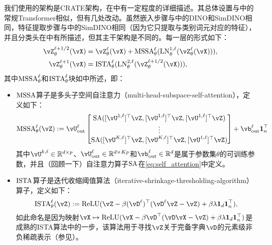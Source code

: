 \documentclass[../../book-main.tex]{subfiles}
\begin{document}
我们使用的架构是CRATE架构，在中有一定程度的详细描述。其总体设置与中的常规Transformer相似，但有几处改动。虽然嵌入步骤与中的DINO和SimDINO相同，特征提取步骤与中的SimDINO相同（因为它只提取与类别词元对应的特征），并且分类头在中有所描述，但其主干架构是不同的。每一层的形式如下：
\begin{align}\label{eq:CARTE updates}
    \vZ_{\theta}^{\ell + 1/2}(\vX)
    &= \vZ_{\theta}^{\ell}(\vX) + \MSSA_{\theta}^{\ell}(\LN_{\theta}^{1, \ell}(\vZ_{\theta}^{\ell}(\vX))), \\ 
    \vZ_{\theta}^{\ell + 1}(\vX)
    &= \ISTA_{\theta}^{\ell}(\LN_{\theta}^{2, \ell}(\vZ_{\theta}^{\ell + 1/2}(\vX))),
\end{align}
其中\(\operatorname{MSSA}_{\theta}^{\ell}\)和\(\operatorname{ISTA}_{\theta}^{\ell}\)块如中所述，即：
\begin{itemize}
    \item \(\operatorname{MSSA}\)算子是多头子空间自注意力（multi-head-subspace-self-attention），定义如下：
    \begin{equation}
        \MSSA_{\theta}^{\ell}(\vZ) := \vU_{\out}^{\ell}\mat{\SA([\vU^{1, \ell}]^{\top}\vZ, [\vU^{1, \ell}]^{\top}\vZ, [\vU^{1, \ell}]^{\top}\vZ)\\ \vdots \\ \SA([\vU^{K, \ell}]^{\top}\vZ, [\vU^{K, \ell}]^{\top}\vZ, [\vU^{1, \ell}]^{\top}\vZ)} + \vb_{\out}^{\ell}\vone_{n}^{\top}
    \end{equation}
    其中\(\vU^{k, \ell} \in \R^{d \times p}\)、\(\vU_{\out}^{\ell} \in \R^{d \times Kp}\)和\(\vb_{\out}^{\ell} \in \R^{d}\)是属于参数集\(\theta\)的可训练参数，并且（回顾一下）自注意力算子\(\operatorname{SA}\)在\eqref{eq:self_attention}中定义。
    \item \(\operatorname{ISTA}\)算子是迭代收缩阈值算法（iterative-shrinkage-thresholding-algorithm）算子，定义如下：
    \begin{equation}
        \ISTA_{\theta}^{\ell}(\vZ) := \ReLU(\vZ - \beta (\vD^{\ell})^{\top}(\vD^{\ell}\vZ - \vZ) + \beta\lambda \vone_{d}\vone_{n}^{\top}),
    \end{equation}
    如此命名是因为映射\(\vX \mapsto \ReLU(\vX - \beta \vD^{\top}(\vD\vX - \vZ) + \beta  \lambda \vone_{d}\vone_{n}^{\top})\)是成熟的ISTA算法中的一步，该算法用于寻找\(\vZ\)关于完备字典\(\vD\)的元素级非负稀疏表示（参见）。
\end{itemize}
\end{document}
